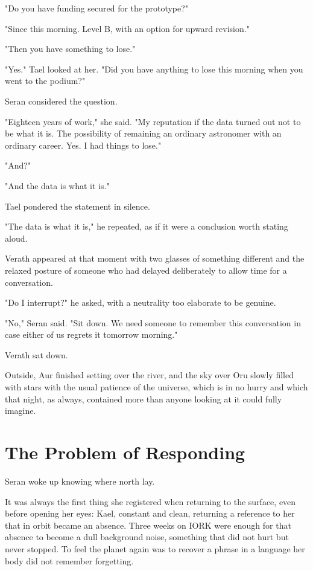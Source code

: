 \documentclass[11pt,a5paper,twoside]{book}
\begin{document}
"Do you have funding secured for the prototype?"

"Since this morning. Level B, with an option for upward revision."

"Then you have something to lose."

"Yes." Tael looked at her. "Did you have anything to lose this morning when you went to the podium?"

Seran considered the question.

"Eighteen years of work," she said. "My reputation if the data turned out not to be what it is. The possibility of remaining an ordinary astronomer with an ordinary career. Yes. I had things to lose."

"And?"

"And the data is what it is."

Tael pondered the statement in silence.

"The data is what it is," he repeated, as if it were a conclusion worth stating aloud.

Verath appeared at that moment with two glasses of something different and the relaxed posture of someone who had delayed deliberately to allow time for a conversation.

"Do I interrupt?" he asked, with a neutrality too elaborate to be genuine.

"No," Seran said. "Sit down. We need someone to remember this conversation in case either of us regrets it tomorrow morning."

Verath sat down.

Outside, Aur finished setting over the river, and the sky over Oru slowly filled with stars with the usual patience of the universe, which is in no hurry and which that night, as always, contained more than anyone looking at it could fully imagine.

\chapter{The Problem of Responding}

Seran woke up knowing where north lay.

It was always the first thing she registered when returning to the surface, even before opening her eyes: Kael, constant and clean, returning a reference to her that in orbit became an absence. Three weeks on IORK were enough for that absence to become a dull background noise, something that did not hurt but never stopped. To feel the planet again was to recover a phrase in a language her body did not remember forgetting.
\end{document}
